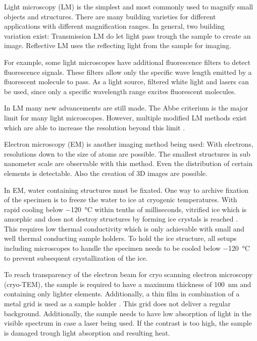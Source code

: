 
Light microscopy (LM) is the simplest and most commonly used to magnify small objects and structures. There are many building varieties for different applications with different magnification ranges. In general, two building variation exist: Transmission LM do let light pass trough the sample to create an image. Reflective LM uses the reflecting light from the sample for imaging. 

For example, some light microscopes have additional fluorescence filters to detect fluorescence signals. These filters allow only the specific wave length emitted by a fluorescent molecule to pass. As a light source, filtered white light and lasers can be used, since only a specific wavelength range excites fluorescent molecules.

In LM many new advancements are still made. The Abbe criterium is the major limit for many light microscopes. However, multiple modified LM methods exist which are able to increase the resolution beyond this limit \cite{Heintzmann.2006}.

Electron microscopy (EM) is another imaging method being used: With electrons, resolutions down to the size of atoms are possible. The smallest structures in sub nanometer scale are observable with this method. Even the distribution of certain elements is detectable. Also the creation of 3D images are possible.

In EM, water containing structures must be fixated. One way to archive fixation of the specimen is to freeze the water to ice at cryogenic temperatures. With rapid cooling below \SI{-120}{\degreeCelsius} within tenths of milliseconds, vitrified ice which is amorphic and does not destroy structures by forming ice crystals is reached  \cite{Wowk.2010}. This requires low thermal conductivity which is only achievable with small and well thermal conducting sample holders. To hold the ice structure, all setups including microscopes to handle the specimen needs to be cooled below \SI{-120}{\degreeCelsius} to prevent subsequent crystallization of the ice.

To reach transparency of the electron beam for cryo scanning electron microscopy (cryo-TEM), the sample is required to have a maximum thickness of \SI{100}{\nano\meter} and containing only lighter elements. Additionally, a thin film in combination of a metal grid is used as a sample holder \cite{Danino.2012}. This grid does not deliver a regular background. Additionally, the sample needs to have low absorption of light in the visible spectrum in case a laser being used. If the contrast is too high, the sample is damaged trough light absorption and resulting heat.

